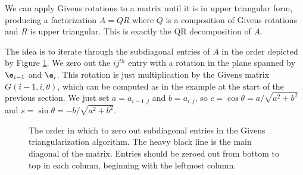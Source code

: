 We can apply Givens rotations to a matrix until it is in upper triangular form, producing a factorization $A = QR$ where $Q$ is a composition of Givens rotations and $R$ is upper triangular.
This is exactly the QR decomposition of $A$.

The idea is to iterate through the subdiagonal entries of $A$ in the order depicted by Figure \ref{fig:givens}.
We zero out the $ij^{th}$ entry with a rotation in the plane spanned by $\e_{i-1}$ and $\e_i$.
This rotation is just multiplication by the Givens matrix $G(i-1,i,\theta)$, which can be computed as in the example at the start of the previous section.
We just set $a=a_{i-1,j}$ and $b=a_{i,j}$, so $c = \cos \theta = a/\sqrt{a^2+b^2}$ and $s = \sin \theta = -b/\sqrt{a^2+b^2}$.

\begin{figure}[H]
\begin{center}
\caption{The order in which to zero out subdiagonal entries in the Givens triangularization algorithm.
The heavy black line is the main diagonal of the matrix.
Entries should be zeroed out from bottom to top in each column, beginning with the leftmost column.}
\label{fig:givens}
\end{center}
\end{figure}

